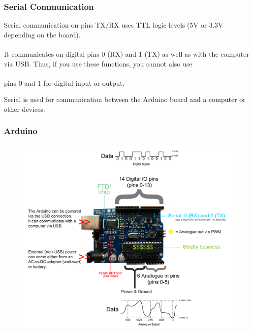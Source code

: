 \begin{frame}
	\frametitle{Serial Communication}
	Serial communication on pins TX/RX uses TTL logic levels (5V or 3.3V depending on the board). \\~\\
		
	It communicates on digital pins 0 (RX) and 1 (TX) as well as with the computer via USB. Thus, if you use these functions, you cannot also use \\~\\pins 0 and 1 for digital input or output. 
	
	
	Serial is used for communication between the Arduino board and a computer or other devices. 
	
\end{frame}

\begin{frame}
	\frametitle{Arduino}
	
	 \begin{figure}
		\includegraphics[scale=.2]{assets/map} 
	\end{figure}
\end{frame}



